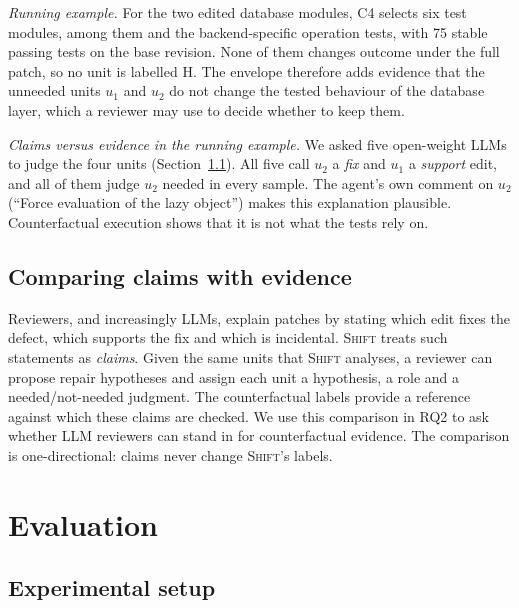 \documentclass[a4paper,fleqn]{cas-sc}
\newcommand{\tool}{\textsc{Shift}}
\newcommand{\code}[1]{\texttt{\detokenize{#1}}}
\newcommand{\lab}[1]{\textsf{#1}}
\begin{document}
\emph{Running example.} For the two edited database modules, C4 selects six test modules, among them \code{backends.base.test_operations} and the backend-specific operation tests, with 75 stable passing tests on the base revision. None of them changes outcome under the full patch, so no unit is labelled \lab{H}. The envelope therefore adds evidence that the unneeded units $u_1$ and $u_2$ do not change the tested behaviour of the database layer, which a reviewer may use to decide whether to keep them.

\emph{Claims versus evidence in the running example.} We asked five open-weight LLMs to judge the four units (Section~\ref{sec:setup}). All five call $u_2$ a \emph{fix} and $u_1$ a \emph{support} edit, and all of them judge $u_2$ needed in every sample. The agent's own comment on $u_2$ (``Force evaluation of the lazy object'') makes this explanation plausible. Counterfactual execution shows that it is not what the tests rely on.


\subsection{Comparing claims with evidence}\label{sec:claims}
Reviewers, and increasingly LLMs, explain patches by stating which edit fixes the defect, which supports the fix and which is incidental. \tool{} treats such statements as \emph{claims}. Given the same units that \tool{} analyses, a reviewer can propose repair hypotheses and assign each unit a hypothesis, a role and a needed/not-needed judgment. The counterfactual labels provide a reference against which these claims are checked. We use this comparison in RQ2 to ask whether LLM reviewers can stand in for counterfactual evidence. The comparison is one-directional: claims never change \tool{}'s labels.

\section{Evaluation}\label{sec:evaluation}

\subsection{Experimental setup}\label{sec:setup}
\end{document}
